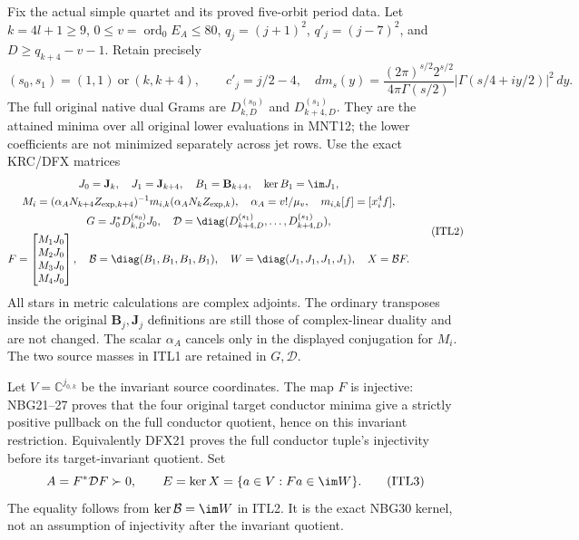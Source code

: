 \documentclass[11pt,a4paper]{article}
\begin{document}
Fix the actual simple quartet and its proved five-orbit period data.
Let $k=4l+1\ge9$, $0\le v=\operatorname{ord}_0 E_A\le80$,
$q_j=(j+1)^2$, $q'_j=(j-7)^2$, and
$D\ge q_{k+4}-v-1$. Retain precisely
\[
 (s_0,s_1)=(1,1)\ \text{or}\ (k,k+4),\qquad
 c'_j=j/2-4,
 \quad
 dm_s(y)=\frac{(2\pi)^{s/2}2^{s/2}}{4\pi\Gamma(s/2)}
       |\Gamma(s/4+iy/2)|^2\,dy.                 \tag{ITL1}
\]
The full original native dual Grams are
$D_{k,D}^{(s_0)}$ and $D_{k+4,D}^{(s_1)}$. They are the
attained minima over all original lower evaluations in MNT12;
the lower coefficients are not minimized separately across jet rows.
Use the exact KRC/DFX matrices
\[
 \begin{gathered}
 J_0=\mathbf J_k,\quad J_1=\mathbf J_{k+4},\quad
 B_1=\mathbf B_{k+4},\quad \ker B_1=\im J_1,\\
 M_i=(\alpha_A N_{k+4}Z_{\exp,k+4})^{-1}
              m_{i,k}(\alpha_A N_kZ_{\exp,k}),\quad
 \alpha_A=v!/\mu_v,\quad m_{i,k}[f]=[x_i^4f],\\
 G=J_0^*D_{k,D}^{(s_0)}J_0,\quad
 \mathcal D=\diag(D_{k+4,D}^{(s_1)},\ldots,D_{k+4,D}^{(s_1)}),\\
 F=\begin{bmatrix}M_1J_0\\M_2J_0\\M_3J_0\\M_4J_0\end{bmatrix},\quad
 \mathcal B=\diag(B_1,B_1,B_1,B_1),\quad
 W=\diag(J_1,J_1,J_1,J_1),\quad X=\mathcal B F .
                                                        \end{gathered} \tag{ITL2}
\]
All stars in metric calculations are complex adjoints. The ordinary
transposes inside the original $\mathbf B_j,\mathbf J_j$ definitions
are still those of complex-linear duality and are not changed.
The scalar $\alpha_A$ cancels only in the displayed conjugation for
$M_i$. The two source masses in ITL1 are retained in $G,\mathcal D$.

Let $V=\mathbb C^{j_{0,k}}$ be the invariant source coordinates.
The map $F$ is injective: NBG21--27 proves that the four original
target conductor minima give a strictly positive pullback on the
full conductor quotient, hence on this invariant restriction.
Equivalently DFX21 proves the full conductor tuple's injectivity
before its target-invariant quotient. Set
\[
 A=F^*\mathcal D F\succ0,\qquad
 E=\ker X=\{a\in V:Fa\in\im W\}.                 \tag{ITL3}
\]
The equality follows from $\ker\mathcal B=\im W$ in ITL2.
It is the exact NBG30 kernel, not an assumption of injectivity
after the invariant quotient.
\end{document}
